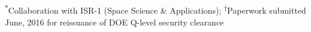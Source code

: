 \centering
\footnotesize
\textsuperscript{$*$}Collaboration with ISR-1 (Space Science \& Applications); \textsuperscript{$\dagger$}Paperwork submitted June, 2016 for reissuance of DOE Q-level security clearance
